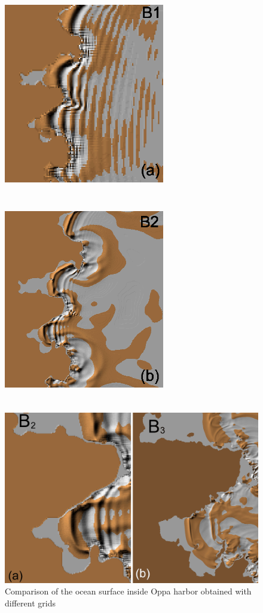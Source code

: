 \documentclass{aip-cp}
\begin{document}
\begin{figure}[h!]
 \hspace*{3mm}
 \includegraphics[width=7cm,height=9cm]{art/Fig_11_a.png}
 \hfill
 \includegraphics[width=7cm,height=9cm]{art/Fig_11_b.png} \hspace*{3mm}
\\
\parbox[t]{0.45\textwidth}{\caption{}} \hfill
\end{figure}


\begin{figure}[ht]
  \centerline{\includegraphics[width=400pt]{art/Fig_12_ab.png}}
  \caption{Comparison of the ocean surface inside Oppa harbor obtained with different grids}
\end{figure}
\end{document}

